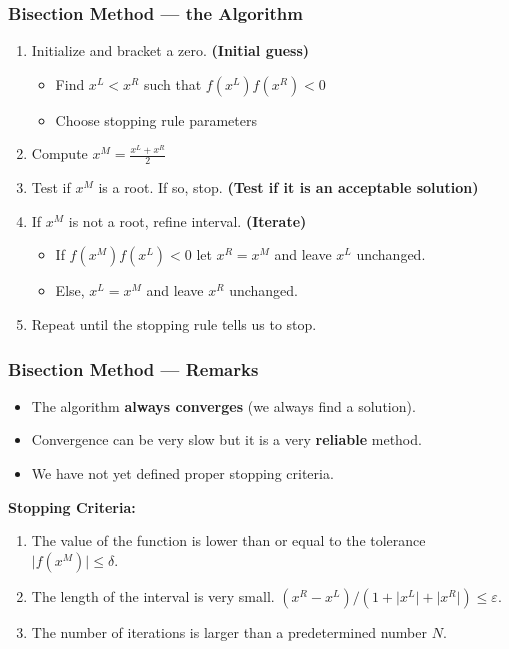 \documentclass[11pt,xcolor={svgnames},aspectratio=169,usepdftitle=false]{beamer}
\begin{document}
\begin{frame}
  \frametitle{Bisection Method --- the Algorithm}
  \begin{enumerate}
    \item Initialize and bracket a zero. {\tiny \alert{\textbf{(Initial guess)}}}
    \begin{itemize}
      \item Find $x^L < x^R$ such that $f(x^L)f(x^R) < 0$
      \item Choose stopping rule parameters
    \end{itemize}
    \item Compute $x^M = \frac{x^L + x^R}{2}$
    \item Test if $x^M$ is a root. If so, stop. {\tiny \alert{\textbf{(Test if it is an acceptable solution)}}}
    \item If $x^M$ is not a root, refine interval. {\tiny \alert{\textbf{(Iterate)}}}
    \begin{itemize}
      \item If $f(x^M)f(x^L) < 0$ let $x^R = x^M$ and leave $x^L$ unchanged.
      \item Else, $x^L = x^M$ and leave $x^R$ unchanged.
    \end{itemize}
    \item Repeat until the stopping rule tells us to stop.
  \end{enumerate}
\end{frame}

\begin{frame}
  \frametitle{Bisection Method --- Remarks}
\begin{itemize}
  \item The algorithm \alert{\textbf{always converges}} (we always find a solution).
  \item Convergence can be very slow but it is a very \alert{\textbf{reliable}} method.
  \item We have not yet defined proper stopping criteria.
\end{itemize}
\alert{\textbf{Stopping Criteria:}}
\begin{enumerate}
  \item The value of the function is lower than or equal to the tolerance $\lvert f(x^M) \rvert \leq \delta$.
  \item The length of the interval is very small. $(x^R - x^L) / (1 + \lvert x^L \rvert + \lvert x^R \rvert) \leq \varepsilon$.
  \item The number of iterations is larger than a predetermined number $N$.
\end{enumerate}
\end{frame}
\end{document}
